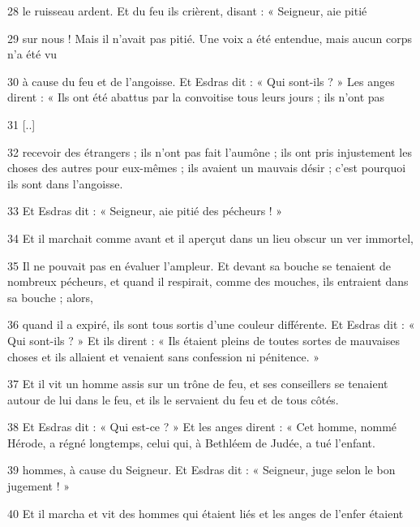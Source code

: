 \par 28 le ruisseau ardent. Et du feu ils crièrent, disant : « Seigneur, aie pitié

\par 29 sur nous ! Mais il n'avait pas pitié. Une voix a été entendue, mais aucun corps n'a été vu

\par 30 à cause du feu et de l'angoisse. Et Esdras dit : « Qui sont-ils ? » Les anges dirent : « Ils ont été abattus par la convoitise tous leurs jours ; ils n'ont pas

\par 31 [..]

\par 32 recevoir des étrangers ; ils n'ont pas fait l'aumône ; ils ont pris injustement les choses des autres pour eux-mêmes ; ils avaient un mauvais désir ; c’est pourquoi ils sont dans l’angoisse.

\par 33 Et Esdras dit : « Seigneur, aie pitié des pécheurs ! »

\par 34 Et il marchait comme avant et il aperçut dans un lieu obscur un ver immortel,

\par 35 Il ne pouvait pas en évaluer l'ampleur. Et devant sa bouche se tenaient de nombreux pécheurs, et quand il respirait, comme des mouches, ils entraient dans sa bouche ; alors,

\par 36 quand il a expiré, ils sont tous sortis d'une couleur différente. Et Esdras dit : « Qui sont-ils ? » Et ils dirent : « Ils étaient pleins de toutes sortes de mauvaises choses et ils allaient et venaient sans confession ni pénitence. »

\par 37 Et il vit un homme assis sur un trône de feu, et ses conseillers se tenaient autour de lui dans le feu, et ils le servaient du feu et de tous côtés.

\par 38 Et Esdras dit : « Qui est-ce ? » Et les anges dirent : « Cet homme, nommé Hérode, a régné longtemps, celui qui, à Bethléem de Judée, a tué l'enfant.

\par 39 hommes, à cause du Seigneur. Et Esdras dit : « Seigneur, juge selon le bon jugement ! »

\par 40 Et il marcha et vit des hommes qui étaient liés et les anges de l'enfer étaient

